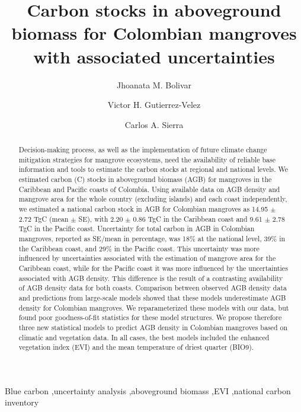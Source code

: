 \documentclass[review, authoryear]{elsarticle}   	%
\begin{document}
\begin{frontmatter}

\title{Carbon stocks in aboveground biomass for Colombian mangroves with associated uncertainties}
\author[MPI,CYB]{Jhoanata M. Bolivar}
\author[TU,CYB]{Victor H. Gutierrez-Velez}
\author[MPI,CYB]{Carlos A. Sierra}
\address[MPI]{Max Planck Institute for Biogeochemistry, Hans-Kn\"oll-Str. 10, 07745 Jena, Germany}
\address[CYB]{Research Center on Ecosystems and Global Change Carbono \& Bosques, Medell\'in, Colombia}
\address[TU]{Department of Geography and Urban Studies, Temple University, Philadelphia, PA 19122, USA}



\begin{abstract}
Decision-making process, as well as the implementation of future climate change mitigation strategies for mangrove ecosystems, need the availability of reliable base information and tools to estimate the carbon stocks at regional and national levels. We estimated carbon (C) stocks in aboveground biomass (AGB) for mangroves in the Caribbean and Pacific coasts of Colombia. Using available data on AGB density and mangrove area for the whole country (excluding islands) and each coast independently, we estimated a national carbon stock in AGB for Colombian mangroves as 14.95 $\pm$ 2.72 TgC (mean $\pm$ SE), with 2.20 $\pm$ 0.86 TgC in the Caribbean coast and 9.61 $\pm$ 2.78 TgC in the Pacific coast. Uncertainty for total carbon in AGB in Colombian mangroves, reported as SE/mean in percentage, was 18\% at the national level, 39\% in the Caribbean coast, and 29\% in the Pacific coast. This uncertainty was more influenced by uncertainties associated with the estimation of mangrove area for the Caribbean coast, while for the Pacific coast it was more influenced by the uncertainties associated with AGB density. This difference is the result of a contrasting availability of AGB density data for both coasts.  Comparison between observed AGB density data and predictions from large-scale models showed that these models underestimate AGB density for Colombian mangroves. We reparameterized these models with our data, but found poor goodness-of-fit statistics for these model structures. We propose therefore three new statistical models to predict AGB density in Colombian mangroves based on climatic and vegetation data. In all cases, the best models included the enhanced vegetation index (EVI) and the mean temperature of driest quarter (BIO9). 
\end{abstract}

\begin{keyword}
Blue carbon \sep uncertainty analysis \sep aboveground biomass \sep EVI \sep national carbon inventory
\end{keyword}

\end{frontmatter}
\end{document}
